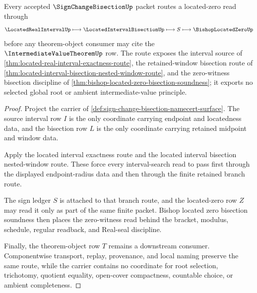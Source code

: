 \begin{theorem}
\label{thm:sign-change-bisection-located-zero-route}
Every accepted $\SignChangeBisectionUp$ packet routes a located-zero read through
$$
\LocatedRealIntervalUp \longmapsto \LocatedIntervalBisectionUp \longmapsto S \longmapsto \BishopLocatedZeroUp
$$
before any theorem-object consumer may cite the $\IntermediateValueTheoremUp$ row. The route exposes the interval source of \autoref{thm:located-real-interval-exactness-route}, the retained-window bisection route of \autoref{thm:located-interval-bisection-nested-window-route}, and the zero-witness bisection discipline of \autoref{thm:bishop-located-zero-bisection-soundness}; it exports no selected global root or ambient intermediate-value principle.
\end{theorem}
\begin{proof}
Project the carrier of \autoref{def:sign-change-bisection-namecert-surface}. The source interval row $I$ is the only coordinate carrying endpoint and locatedness data, and the bisection row $L$ is the only coordinate carrying retained midpoint and window data.

Apply the located interval exactness route and the located interval bisection nested-window route. These force every interval-search read to pass first through the displayed endpoint-radius data and then through the finite retained branch route.

The sign ledger $S$ is attached to that branch route, and the located-zero row $Z$ may read it only as part of the same finite packet. Bishop located zero bisection soundness then places the zero-witness read behind the bracket, modulus, schedule, regular readback, and Real-seal discipline.

Finally, the theorem-object row $T$ remains a downstream consumer. Componentwise transport, replay, provenance, and local naming preserve the same route, while the carrier contains no coordinate for root selection, trichotomy, quotient equality, open-cover compactness, countable choice, or ambient completeness.
\end{proof}



